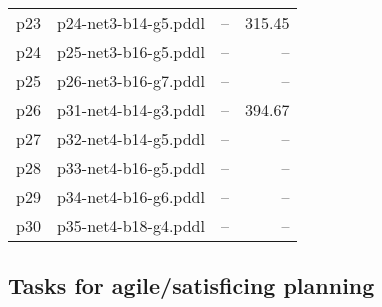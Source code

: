 \documentclass{article}
\begin{document}
\begin{center}
\begin{tabular}{@{}l|r|r|r@{}}
  p23& p24-net3-b14-g5.pddl&--&315.45\\
  p24& p25-net3-b16-g5.pddl&--&--\\
  p25& p26-net3-b16-g7.pddl&--&--\\
  p26& p31-net4-b14-g3.pddl&--&394.67\\
  p27& p32-net4-b14-g5.pddl&--&--\\
  p28& p33-net4-b16-g5.pddl&--&--\\
  p29& p34-net4-b16-g6.pddl&--&--\\
  p30& p35-net4-b18-g4.pddl&--&--
                            \end{tabular}
                            \end{center}
                    

                    \subsection*{Tasks for agile/satisficing planning}
                    
\end{document}
